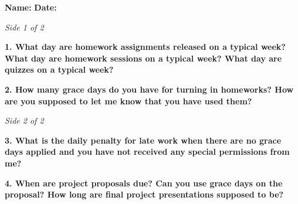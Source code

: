 \documentclass[12pt]{article}
\begin{document}
\noindent
\textbf{Name:}\underline{\hspace{6cm}} \hfill \textbf{Date:}\underline{\hspace{3cm}}

\vspace{0.5em}
\noindent\textit{Side 1 of 2}

\vspace{1.5em}
\noindent\textbf{1. What day are homework assignments released on a typical week? What day are homework sessions on a typical week? What day are quizzes on a typical week?}

\vfill

\noindent\textbf{2. How many grace days do you have for turning in homeworks? How are you supposed to let me know that you have used them?}

\vfill

\newpage

\noindent\textit{Side 2 of 2}

\vspace{1.5em}
\noindent\textbf{3. What is the daily penalty for late work when there are no grace days applied and you have not received any special permissions from me?}

\vfill

\noindent\textbf{4. When are project proposals due? Can you use grace days on the proposal? How long are final project presentations supposed to be?}

\vfill
\end{document}
